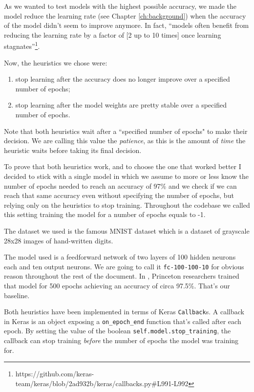 As we wanted to test models with the highest possible accuracy, we made
the model reduce the learning rate (see Chapter \ref{ch:background})
when the accuracy of the model didn't seem to improve anymore. In fact,
``models often benefit from reducing the learning rate by a factor of
[2 up to 10 times] once learning
stagnates''\footnote{https://github.com/keras-team/keras/blob/2ad932b/keras/callbacks.py\#L991-L992}.

Now, the heuristics we chose were:
\begin{enumerate}
  \item stop learning after the accuracy does no longer improve over a
    specified number of epochs;
  \item stop learning after the model weights are pretty stable over a
    specified number of epochs.
\end{enumerate}

Note that both heuristics wait after a ``specified number of
epochs" to make their decision. We are calling this value the
\emph{patience}, as this is the amount of \emph{time} the heuristic waits
before taking its final decision.

To prove that both heuristics work, and to choose the one that
worked better I decided to stick with a single model in which we assume
to more or less know the number of epochs needed to reach an accuracy
of 97\% and we check if we can reach that same accuracy even without
specifying the number of epochs, but relying only on the heuristics to
stop training. Throughout the codebase we called this setting training
the model for a number of epochs equals to -1.

The dataset we used is the famous MNIST dataset which is a dataset of
grayscale 28x28 images of hand-written digits.

The model used is a feedforward network of two layers of 100 hidden
neurons each and ten output neurons. We are going to call it
\texttt{fc-100-100-10} for obvious reason throughout the rest of the
document. In \cite{bhagoji2018enhancing}, Princeton researchers trained
that model for 500 epochs achieving an accuracy of circa 97.5\%. That's our
baseline.

Both heuristics have been implemented in terms of Keras
\texttt{Callback}s. A callback in Keras is an object exposing a
\texttt{on_epoch_end} function that's called after each epoch. By
setting the value of the boolean \texttt{self.model.stop_training}, the
callback can stop training \emph{before} the number of epochs the model
was training for.

